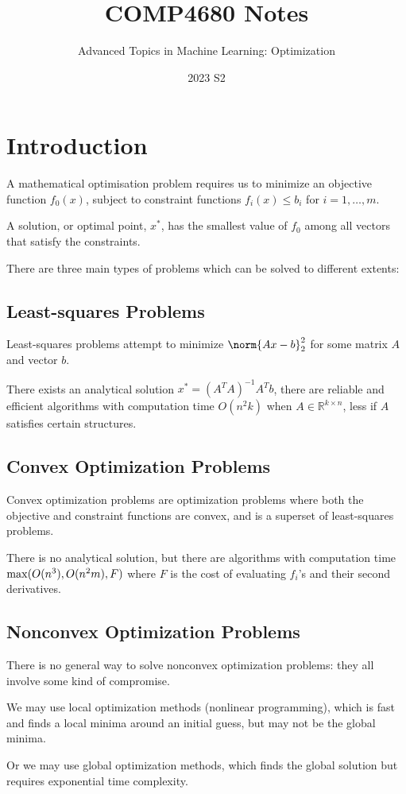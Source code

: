\documentclass[11pt]{article}
\title{COMP4680 Notes}
\author{Advanced Topics in Machine Learning: Optimization}
\date{2023 S2}
\begin{document}
\maketitle

\setcounter{section}{-1}
\section{Introduction} 
A mathematical optimisation problem requires us to minimize an objective function $f_0(x)$, subject to constraint functions $f_i(x) \leq b_i$ for $i = 1, \ldots, m$. \par
A solution, or optimal point, $x^*$, has the smallest value of $f_0$ among all vectors that satisfy the constraints. \par 
There are three main types of problems which can be solved to different extents: 
\subsection{Least-squares Problems} 
Least-squares problems attempt to minimize $\norm{Ax - b}_2^2$ for some matrix $A$ and vector $b$. \par
There exists an analytical solution $x^* = (A^TA)^{-1}A^Tb$, there are reliable and efficient algorithms with computation time $O(n^2k)$ when $A \in \mathbb{R}^{k\times n}$, less if $A$ satisfies certain structures. 
\subsection{Convex Optimization Problems} 
Convex optimization problems are optimization problems where both the objective and constraint functions are convex, and is a superset of least-squares problems. \par 
There is no analytical solution, but there are algorithms with computation time $\mathrm{max}(O(n^3), \\O(n^2m), F)$ where $F$ is the cost of evaluating $f_i$'s and their second derivatives. 
\subsection{Nonconvex Optimization Problems} 
There is no general way to solve nonconvex optimization problems: they all involve some kind of compromise. \par
We may use local optimization methods (nonlinear programming), which is fast and finds a local minima around an initial guess, but may not be the global minima. \par
Or we may use global optimization methods, which finds the global solution but requires exponential time complexity. 
\end{document}
